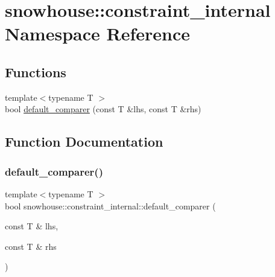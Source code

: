 \hypertarget{namespacesnowhouse_1_1constraint__internal}{}\section{snowhouse\+::constraint\+\_\+internal Namespace Reference}
\label{namespacesnowhouse_1_1constraint__internal}
\subsection*{Functions}
\begin{DoxyCompactItemize}
\item 
{\footnotesize template$<$typename T $>$ }\\bool \mbox{\hyperlink{namespacesnowhouse_1_1constraint__internal_a26517c460816dd6e779d7d0a12b243cb}{default\+\_\+comparer}} (const T \&lhs, const T \&rhs)
\end{DoxyCompactItemize}


\subsection{Function Documentation}
\mbox{\label{namespacesnowhouse_1_1constraint__internal_a26517c460816dd6e779d7d0a12b243cb}} 
\subsubsection{\texorpdfstring{default\_comparer()}{default\_comparer()}}
{\footnotesize\ttfamily template$<$typename T $>$ \\
bool snowhouse\+::constraint\+\_\+internal\+::default\+\_\+comparer (\begin{DoxyParamCaption}\item[{const T \&}]{lhs,  }\item[{const T \&}]{rhs }\end{DoxyParamCaption})\hspace{0.3cm}{\ttfamily [inline]}}

